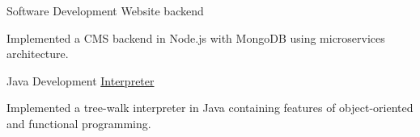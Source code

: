 \begin{cventries}
  \cventry
    {Software Development} %
    {Website backend} %
    {} %
    {} %
    {
      \begin{cvitems}
        \item{Implemented a CMS backend in Node.js with MongoDB using microservices
         architecture.}
      \end{cvitems}
    }

  \cventry
    {Java Development} %
    {\href{https://github.com/prashantpiyush/yai-java}{Interpreter}} %
    {} %
    {} %
    {
      \begin{cvitems}
        \item{Implemented a tree-walk interpreter in Java
         containing features of object-oriented and functional programming.}
      \end{cvitems}
    }

\end{cventries}
